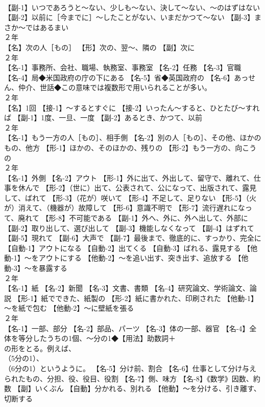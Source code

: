 \documentclass[8pt]{extreport}
\begin{document}
\begin{CJK}{UTF8}{min}
\\	【副-1】いつであろうと～ない、少しも～ない、決して～ない、～のはずはない 【副-2】以前に［今までに］～したことがない、いまだかつて～ない 【副-3】まさか～ではあるまい
\\	２年	
\\	【名】次の人［もの］ 【形】次の、翌～、隣の 【副】次に
\\	２年	
\\	【名-1】事務所、会社、職場、執務室、事務室 【名-2】任務 【名-3】官職 【名-4】局◆米国政府の庁の下にある 【名-5】省◆英国政府の 【名-6】あっせん、仲介、世話◆この意味では複数形で用いられることが多い。
\\	２年	
\\	【名】1回 【接-1】～するとすぐに 【接-2】いったん～すると、ひとたび～すれば 【副-1】1度、一旦、一度 【副-2】あるとき、かつて、以前
\\	２年	
\\	【名-1】もう一方の人［もの］、相手側 【名-2】別の人［もの］、その他、ほかのもの、他方 【形-1】ほかの、そのほかの、残りの 【形-2】もう一方の、向こうの
\\	２年	
\\	【名-1】外側 【名-2】アウト 【形-1】外に出て、外出して、留守で、離れて、仕事を休んで 【形-2】（世に）出て、公表されて、公になって、出版されて、露見して、ばれて 【形-3】（花が）咲いて 【形-4】不足して、足りない 【形-5】（火が）消えて、（機器が）故障して 【形-6】意識不明で 【形-7】流行遅れになって、廃れて 【形-8】不可能である 【副-1】外へ、外に、外へ出して、外部に 【副-2】取り出して、選び出して 【副-3】機能しなくなって 【副-4】はずれて 【副-5】現れて 【副-6】大声で 【副-7】最後まで、徹底的に、すっかり、完全に 【自動-1】アウトになる 【自動-2】出てくる 【自動-3】ばれる、露見する 【他動-1】～をアウトにする 【他動-2】～を追い出す、突き出す、追放する 【他動-3】～を暴露する
\\	２年	
\\	【名-1】紙 【名-2】新聞 【名-3】文書、書類 【名-4】研究論文、学術論文、論説 【形-1】紙でできた、紙製の 【形-2】紙に書かれた、印刷された 【他動-1】～を紙で包む 【他動-2】～に壁紙を張る
\\	２年	
\\	【名-1】一部、部分 【名-2】部品、パーツ 【名-3】体の一部、器官 【名-4】全体を等分したうちの1個、～分の1◆【用法】助数詞＋
\\	の形をとる。例えば、
\\	（5分の1）、
\\	（6分の1）というように。 【名-5】分け前、割合 【名-6】仕事として分け与えられたもの、分担、役、役目、役割 【名-7】側、味方 【名-8】《数学》因数、約数 【副】いくぶん 【自動】分かれる、別れる 【他動】～を分ける、引き離す、切断する

\end{CJK}
\end{document}
